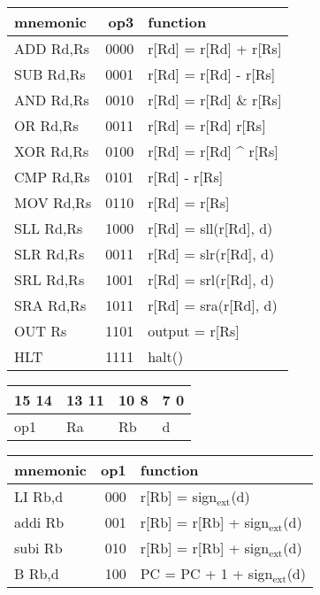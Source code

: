 \documentclass{jarticle}
\begin{document}
\begin{enumerate}
\begin{center}
\begin{tabular}{lrl}
\hline
mnemonic & op3 & function\\
\hline
ADD Rd,Rs & 0000 & r[Rd] = r[Rd] + r[Rs]\\
\hline
SUB Rd,Rs & 0001 & r[Rd] = r[Rd] - r[Rs]\\
\hline
AND Rd,Rs & 0010 & r[Rd] = r[Rd] \& r[Rs]\\
\hline
OR Rd,Rs & 0011 & r[Rd] = r[Rd]  r[Rs]\\
\hline
XOR Rd,Rs & 0100 & r[Rd] = r[Rd] \^{} r[Rs]\\
\hline
CMP Rd,Rs & 0101 & r[Rd] -  r[Rs]\\
\hline
MOV Rd,Rs & 0110 & r[Rd] =  r[Rs]\\
\hline
SLL Rd,Rs & 1000 & r[Rd] = sll(r[Rd], d)\\
\hline
SLR Rd,Rs & 0011 & r[Rd] = slr(r[Rd], d)\\
\hline
SRL Rd,Rs & 1001 & r[Rd] = srl(r[Rd], d)\\
\hline
SRA Rd,Rs & 1011 & r[Rd] = sra(r[Rd], d)\\
\hline
OUT Rs & 1101 & output = r[Rs]\\
\hline
HLT & 1111 & halt()\\
\hline
\end{tabular}
\end{center}


\begin{center}
\begin{tabular}{llll}
\hline
15   14 & 13  11 & 10  8 & 7       0\\
\hline
op1 & Ra & Rb & d\\
\hline
\end{tabular}
\end{center}

\begin{center}
\begin{tabular}{lrl}
\hline
mnemonic & op1 & function\\
\hline
LI Rb,d & 000 & r[Rb] = sign$_{\text{ext}}$(d)\\
\hline
addi Rb & 001 & r[Rb] = r[Rb] + sign$_{\text{ext}}$(d)\\
\hline
subi Rb & 010 & r[Rb] = r[Rb] + sign$_{\text{ext}}$(d)\\
\hline
B Rb,d & 100 & PC = PC + 1 + sign$_{\text{ext}}$(d)\\
\hline
\end{tabular}
\end{center}



\end{enumerate}
\end{document}
